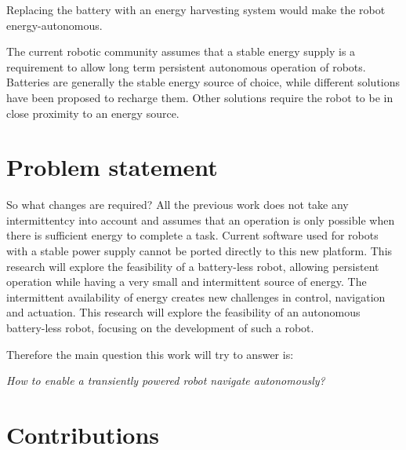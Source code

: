 Replacing the battery with an energy harvesting system would make the robot energy-autonomous. 


The current robotic community assumes that a stable energy supply is a requirement to allow long term persistent autonomous operation of robots.
Batteries are generally the stable energy source of choice, while different solutions have been proposed to recharge them.
Other solutions require the robot to be in close proximity to an energy source.








\section{Problem statement}


So what changes are required?
All the previous work does not take any intermittentcy into account and assumes that an operation is only possible when there is sufficient energy to complete a task.
Current software used for robots with a stable power supply cannot be ported directly to this new platform.
This research will explore the feasibility of a battery-less robot, allowing persistent operation while having a very small and intermittent source of energy.
The intermittent availability of energy creates new challenges in control, navigation and actuation. 
This research will explore the feasibility of an autonomous battery-less robot, focusing on the development of such a robot.


Therefore the main question this work will try to answer is:

\begin{center}
	\textit{How to enable a transiently powered robot navigate autonomously?}
\end{center}

\section{Contributions}

